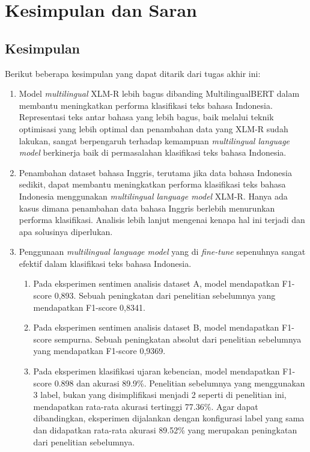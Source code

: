 \chapter{Kesimpulan dan Saran}

\section{Kesimpulan}
Berikut beberapa kesimpulan yang dapat ditarik dari tugas akhir ini:
\begin{enumerate}
    \item Model \textit{multilingual} XLM-R lebih bagus dibanding MultilingualBERT dalam membantu meningkatkan performa klasifikasi teks bahasa Indonesia. Representasi teks antar bahasa yang lebih bagus, baik melalui teknik optimisasi yang lebih optimal dan penambahan data yang XLM-R sudah lakukan, sangat berpengaruh terhadap kemampuan \textit{multilingual language model} berkinerja baik di permasalahan klasifikasi teks bahasa Indonesia.
    \item Penambahan dataset bahasa Inggris, terutama jika data bahasa Indonesia sedikit, dapat membantu meningkatkan performa klasifikasi teks bahasa Indonesia menggunakan \textit{multilingual language model} XLM-R.  Hanya ada kasus dimana penambahan data bahasa Inggris berlebih menurunkan performa klasifikasi. Analisis lebih lanjut mengenai kenapa hal ini terjadi dan apa solusinya diperlukan.
    \item Penggunaan \textit{multilingual language model} yang di \textit{fine-tune} sepenuhnya sangat efektif dalam klasifikasi teks bahasa Indonesia. 
    \begin{enumerate}
    	\item Pada eksperimen sentimen analisis dataset A, model mendapatkan F1-score 0,893. Sebuah peningkatan dari penelitian sebelumnya yang mendapatkan F1-score 0,8341.
        \item Pada eksperimen sentimen analisis dataset B, model mendapatkan F1-score sempurna. Sebuah peningkatan absolut dari penelitian sebelumnya yang mendapatkan F1-score 0,9369.
        \item Pada eksperimen klasifikasi ujaran kebencian, model mendapatkan F1-score 0.898 dan akurasi 89.9\%. Penelitian sebelumnya yang menggunakan 3 label, bukan yang disimplifikasi menjadi 2 seperti di penelitian ini, mendapatkan rata-rata akurasi tertinggi 77.36\%. Agar dapat dibandingkan, eksperimen dijalankan dengan konfigurasi label yang sama dan didapatkan rata-rata akurasi 89.52\% yang merupakan peningkatan dari penelitian sebelumnya.
    \end{enumerate}

\end{enumerate}

